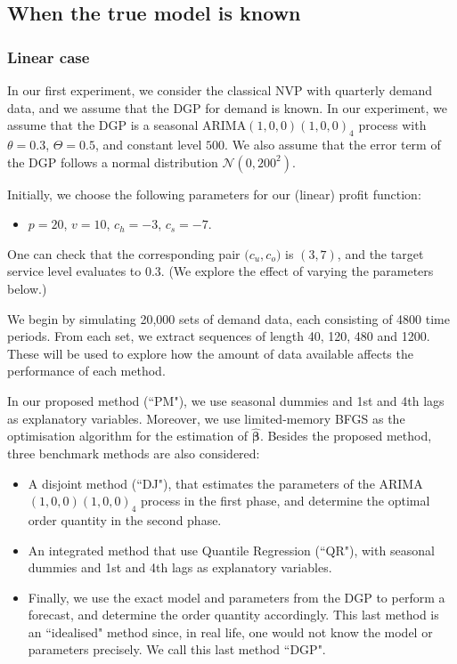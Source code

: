 \documentclass{article}
\begin{document}
\subsection{When the true model is known}
\subsubsection{Linear case} \label{sub:exp1}

In our first experiment, we consider the classical NVP with quarterly demand data, and we assume that the DGP for demand is known. In our experiment, we assume that the DGP is a seasonal ARIMA$(1,0,0)(1,0,0)_4$ process with $\theta=0.3$, $\Theta=0.5$, and constant level $500$. We also assume that the error term of the DGP follows a normal distribution $\mathcal{N}(0,200^2)$.

Initially, we choose the following parameters for our (linear) profit function:
\begin{itemize}
    \item $p=20$, $v=10$, $c_h=-3$, $c_s=-7$.
\end{itemize}
One can check that the corresponding pair $\big( c_u,c_o \big)$ is $(3,7)$, and the target service level evaluates to $0.3$. (We explore the effect of varying the parameters below.)

We begin by simulating 20,000 sets of demand data, each consisting of 4800 time periods. From each set, we extract sequences of length 40, 120, 480 and 1200. These will be used to explore how the amount of data available affects the performance of each method.

In our proposed method (``PM"), we use seasonal dummies and 1st and 4th lags as explanatory variables. Moreover, we use limited-memory BFGS \cite{LN89} as the optimisation algorithm for the estimation of $\hat{\boldsymbol{\beta}}$. Besides the proposed method, three benchmark methods are also considered:
\begin{itemize}
    \item A disjoint method (``DJ"), that estimates the parameters of the ARIMA$(1,0,0)(1,0,0)_4$ process in the first phase, and determine the optimal order quantity in the second phase.
    \item An integrated method that use Quantile Regression (``QR"), with seasonal dummies and 1st and 4th lags as explanatory variables.
    \item Finally, we use the exact model and parameters from the DGP to perform a forecast, and determine the order quantity accordingly. This last method is an ``idealised" method since, in real life, one would not know the model or parameters precisely. We call this last method ``DGP".
\end{itemize}
\end{document}
